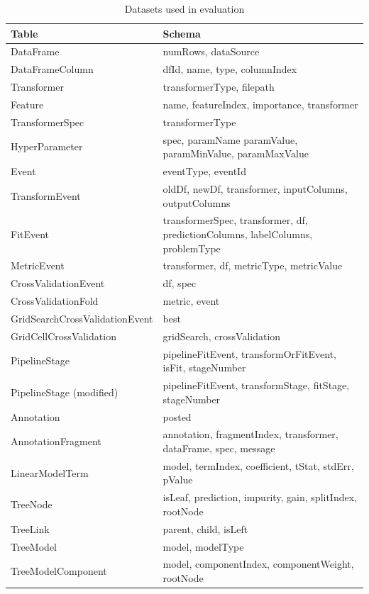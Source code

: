 \begin{landscape}
\begin{table}
 \centering
  \begin{tabular}{ | l | l |}
    \hline
    Table & Schema \\ \hline
    DataFrame & numRows, dataSource \\ \hline
    DataFrameColumn & dfId, name, type, columnIndex \\ \hline
    Transformer & transformerType, filepath \\ \hline
    Feature & name, featureIndex, importance, transformer \\ \hline
    TransformerSpec & transformerType \\ \hline
    HyperParameter & spec, paramName paramValue, paramMinValue, paramMaxValue \\ \hline
    Event & eventType, eventId \\ \hline
    TransformEvent & oldDf, newDf, transformer, inputColumns, outputColumns \\ \hline
    FitEvent & transformerSpec, transformer, df, predictionColumns, labelColumns, problemType \\ \hline
    MetricEvent & transformer, df, metricType, metricValue \\ \hline
    CrossValidationEvent & df, spec \\ \hline
    CrossValidationFold & metric, event \\ \hline
    GridSearchCrossValidationEvent & best \\ \hline
    GridCellCrossValidation & gridSearch, crossValidation \\ \hline
    PipelineStage & pipelineFitEvent, transformOrFitEvent, isFit, stageNumber \\ \hline
    PipelineStage (modified) & pipelineFitEvent, transformStage, fitStage, stageNumber \\ \hline
    Annotation & posted \\ \hline
    AnnotationFragment & annotation, fragmentIndex, transformer, dataFrame, spec, message \\ \hline
    LinearModelTerm & model, termIndex, coefficient, tStat, stdErr, pValue \\ \hline
    TreeNode & isLeaf, prediction, impurity, gain, splitIndex, rootNode \\ \hline
    TreeLink & parent, child, isLeft \\ \hline
    TreeModel & model, modelType \\ \hline
    TreeModelComponent & model, componentIndex, componentWeight, rootNode \\ \hline
    \hline
 \end{tabular}
 \caption{Datasets used in evaluation}
 \label{tab:summary}
\end{table}
\end{landscape}

